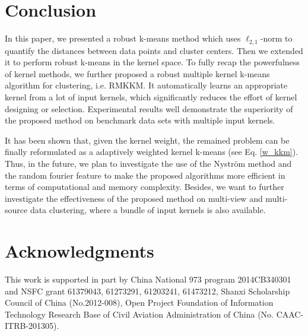 \documentclass{article}
\begin{document}
\section{Conclusion}
In this paper, we presented a robust k-means method which uses $\ell_{2,1}$-norm to quantify the distances between data points and cluster centers. Then we extended it to perform robust k-means in the kernel space. To fully recap the powerfulness of kernel methods, we further proposed a robust multiple kernel k-means algorithm for clustering, i.e. RMKKM. It automatically learns an appropriate kernel from a lot of input kernels, which significantly reduces the effort of kernel designing or selection. Experimental results well demonstrate the superiority of the proposed method on benchmark data sets with multiple input kernels.

It has been shown that, given the kernel weight, the remained problem can be finally reformulated as a adaptively weighted kernel k-means (see Eq. \eqref{w_kkm}). Thus, in the future, we plan to investigate the use of the Nystr{\"o}m method \cite{elgohary2014Embd} and the random fourier feature \cite{yang2012nystrom} to make the proposed algorithms more efficient in terms of computational and memory complexity. Besides, we want to further investigate the effectiveness of the proposed method on multi-view and multi-source data clustering, where a bundle of input kernels is also available.
\section{Acknowledgments}
This work is supported in part by China National 973 program 2014CB340301 and NSFC grant 61379043, 61273291, 61203241, 61473212, Shanxi Scholarship Council of China (No.2012-008), Open Project Foundation of Information Technology Research Base of Civil Aviation Administration of China (No. CAAC-ITRB-201305).

\nocite{*}


\end{document}
